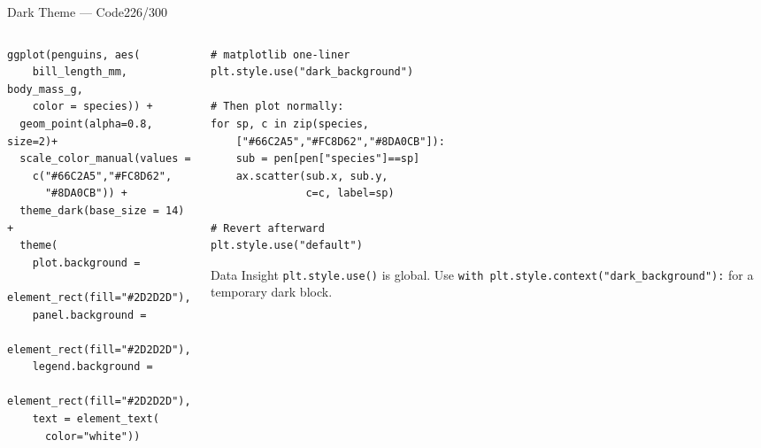 \documentclass[10pt]{beamer}
\newcommand{\smark}[1]{\hfill{\scriptsize\color{codegray}#1}}
\begin{document}
\begin{frame}[fragile]{Dark Theme --- Code}\smark{226/300}
\begin{columns}[T]
\begin{column}{0.48\textwidth}
\begin{lstlisting}[style=Rstyle]
ggplot(penguins, aes(
    bill_length_mm, body_mass_g,
    color = species)) +
  geom_point(alpha=0.8, size=2)+
  scale_color_manual(values =
    c("#66C2A5","#FC8D62",
      "#8DA0CB")) +
  theme_dark(base_size = 14) +
  theme(
    plot.background =
      element_rect(fill="#2D2D2D"),
    panel.background =
      element_rect(fill="#2D2D2D"),
    legend.background =
      element_rect(fill="#2D2D2D"),
    text = element_text(
      color="white"))
\end{lstlisting}
\end{column}
\begin{column}{0.48\textwidth}
\begin{lstlisting}[style=Pystyle]
# matplotlib one-liner
plt.style.use("dark_background")

# Then plot normally:
for sp, c in zip(species,
    ["#66C2A5","#FC8D62","#8DA0CB"]):
    sub = pen[pen["species"]==sp]
    ax.scatter(sub.x, sub.y,
               c=c, label=sp)

# Revert afterward
plt.style.use("default")
\end{lstlisting}
\vspace{0.1cm}
\begin{exampleblock}{Data Insight}
    \scriptsize \texttt{plt.style.use()} is global. Use \texttt{with plt.style.context("dark\_background"):} for a temporary dark block.
\end{exampleblock}
\end{column}
\end{columns}
\end{frame}
\end{document}
